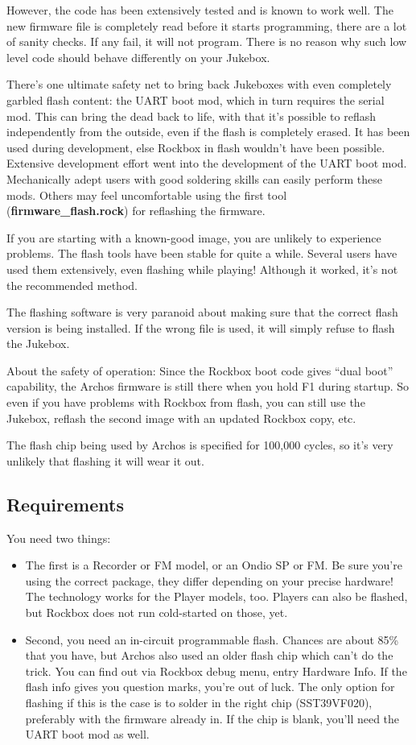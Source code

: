 However, the code has been extensively tested and is known to work well.
 The new firmware file is completely read before it starts programming,
there are a lot of sanity checks. If any fail, it will not program.
There is no reason why such low level code should behave differently on
your Jukebox. 

There's one ultimate safety net to bring back Jukeboxes
with even completely garbled flash content: the UART boot mod, which in
turn requires the serial mod. This can bring the dead back to life,
with that it's possible to reflash independently from the outside, even
if the flash is completely erased. It has been used during development,
else Rockbox in flash wouldn't have been possible.
Extensive development effort went into the development of the UART boot
mod.  Mechanically adept users with good soldering skills can easily
perform these mods. Others may feel uncomfortable using the first tool
(\textbf{firmware\_flash.rock}) for reflashing the firmware.

If you are starting with a known{}-good image, you are unlikely to
experience problems.  The flash tools have been stable for quite a
while. Several users have used them extensively, even flashing while
playing! Although it worked, it's not the recommended
method.  

The flashing software is very paranoid about making sure that the
correct flash version is being installed.  If the wrong file is used,
it will simply refuse to flash the Jukebox.

About the safety of operation: Since the Rockbox boot code gives ``dual
boot'' capability, the Archos firmware is still there when you hold F1
during startup. So even if you have problems with Rockbox from flash, you can still use
the Jukebox, reflash the second image with an updated Rockbox copy,
etc. 

The flash chip being used by Archos is specified for 100,000 cycles, so
it's very unlikely that flashing it will wear it out. 

\subsection{\label{ref:Requirements}Requirements}
You need two things: 

\begin{itemize}
\item The first is a Recorder or FM model, or an Ondio SP or FM. Be sure
you're using the correct package, they differ
depending on your precise hardware! The technology works for the Player
models, too. Players can also be flashed, but Rockbox does not run
cold{}-started on those, yet. 
\item Second, you need an in{}-circuit programmable flash. Chances are
about 85\% that you have, but Archos also used an older flash chip
which can't do the trick. You can find out via Rockbox
debug menu, entry Hardware Info. If the flash info gives you question
marks, you're out of luck. The only option for
flashing if this is the case is to solder in the right chip
(SST39VF020), preferably with the firmware already in. If the chip is
blank, you'll need the UART boot mod as well. 
\end{itemize}
